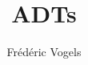\documentclass{../khlslides}
\title[ADTs]{ADTs}
\author{Fr\'ed\'eric Vogels}
\begin{document}
\begin{frame}
  \titlepage
\end{frame}





\end{document}
